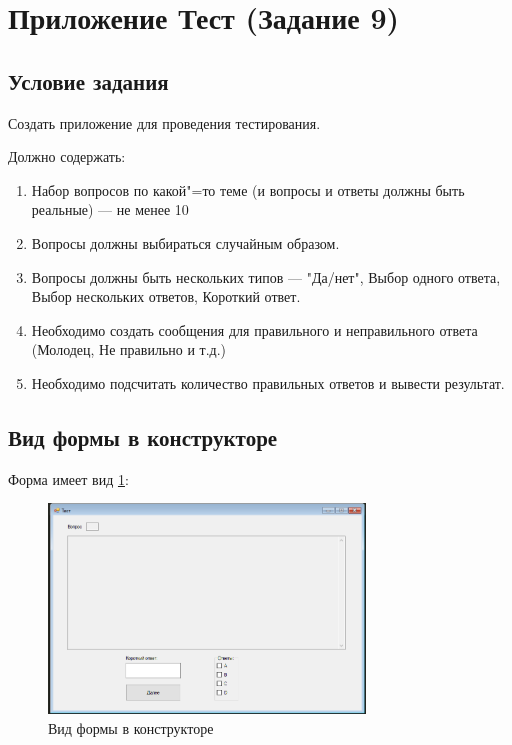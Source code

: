 \section{Приложение Тест (Задание 9)}

\subsection{Условие задания}

Создать приложение для проведения тестирования.

Должно содержать:


\begin{enumerate}
    \item{Набор вопросов по какой"=то теме (и вопросы и ответы должны быть реальные) --- не менее 10}
    \item{Вопросы должны выбираться случайным образом.}
    \item{Вопросы должны быть нескольких типов --- "Да/нет", Выбор одного ответа, Выбор нескольких ответов, Короткий ответ.}
    \item{Необходимо создать сообщения для правильного и неправильного ответа (Молодец, Не правильно и т.д.)}
    \item{Необходимо подсчитать количество правильных ответов и вывести результат.}
\end{enumerate}

\subsection{Вид формы в конструкторе}

Форма имеет вид \ref{fig:FormInConstruct9}:

\begin{figure}[!h]
    \centering
    \includegraphics[width = 0.75\textwidth]{images/Task9/FormInConstructor.png}
    \caption{Вид формы в конструкторе}
    \label{fig:FormInConstruct9}
\end{figure}

